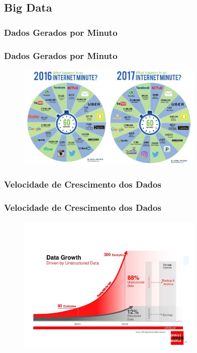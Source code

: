 \documentclass[pdf,9pt,xcolor=dvipsnames,hide notes]{beamer}\usepackage[]{graphicx}\usepackage[]{color}
\begin{document}
\subsection{Big Data}
\subsubsection{Dados Gerados por Minuto}
\begin{frame}\frametitle{Dados Gerados por Minuto} 
  \begin{figure}[hb]
    \includegraphics[width=3.5in]{Figure/dataGeneratorByMinuteExcelacom.jpg}
  \end{figure}
\end{frame}

\subsubsection{Velocidade de Crescimento dos Dados}
\begin{frame}\frametitle{Velocidade de Crescimento dos Dados} 
  \begin{figure}[hb]
    \includegraphics[width=3.5in]{Figure/dataGrowth.jpg}
  \end{figure}
\end{frame}


% 
\end{document}
